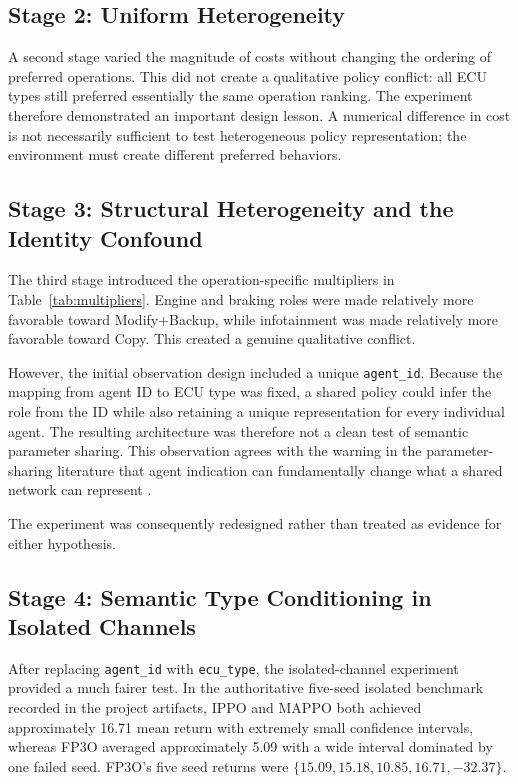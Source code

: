 \documentclass{iutbscthesis}
\begin{document}
\subsection{Stage 2: Uniform Heterogeneity}
A second stage varied the magnitude of costs without changing the ordering of preferred operations. This did not create a qualitative policy conflict: all ECU types still preferred essentially the same operation ranking. The experiment therefore demonstrated an important design lesson. A numerical difference in cost is not necessarily sufficient to test heterogeneous policy representation; the environment must create different preferred behaviors.

\subsection{Stage 3: Structural Heterogeneity and the Identity Confound}
The third stage introduced the operation-specific multipliers in Table~\ref{tab:multipliers}. Engine and braking roles were made relatively more favorable toward Modify+Backup, while infotainment was made relatively more favorable toward Copy. This created a genuine qualitative conflict.

However, the initial observation design included a unique \texttt{agent\_id}. Because the mapping from agent ID to ECU type was fixed, a shared policy could infer the role from the ID while also retaining a unique representation for every individual agent. The resulting architecture was therefore not a clean test of semantic parameter sharing. This observation agrees with the warning in the parameter-sharing literature that agent indication can fundamentally change what a shared network can represent \parencite{terry2020revisiting}.

The experiment was consequently redesigned rather than treated as evidence for either hypothesis.

\subsection{Stage 4: Semantic Type Conditioning in Isolated Channels}
After replacing \texttt{agent\_id} with \texttt{ecu\_type}, the isolated-channel experiment provided a much fairer test. In the authoritative five-seed isolated benchmark recorded in the project artifacts, IPPO and MAPPO both achieved approximately 16.71 mean return with extremely small confidence intervals, whereas FP3O averaged approximately 5.09 with a wide interval dominated by one failed seed. FP3O's five seed returns were $\{15.09,15.18,10.85,16.71,-32.37\}$.
\end{document}
